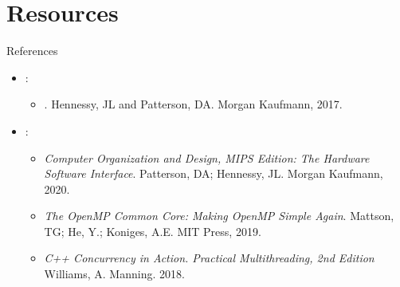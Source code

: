 \section{Resources}

\begin{frame}[t]{References}
\begin{itemize}
  \item {}:
    \begin{itemize}
      \item {}. 
            Hennessy, JL and Patterson, DA. 
            Morgan Kaufmann, 2017.
    \end{itemize}
  \vspace{1em}
  \pause
  \item {}:
    \begin{itemize}
      \item \emph{Computer Organization and Design, MIPS Edition: The Hardware Software Interface}. 
            Patterson, DA; Hennessy, JL. 
            Morgan Kaufmann, 2020.
      \item \emph{The OpenMP Common Core: Making OpenMP Simple Again}.
            Mattson, TG; He, Y.; Koniges, A.E.
            MIT Press, 2019. 
      \item \emph{C++ Concurrency in Action. Practical Multithreading, 2nd Edition} 
            Williams, A.  
            Manning. 2018.
    \end{itemize}
\end{itemize}
\end{frame}

